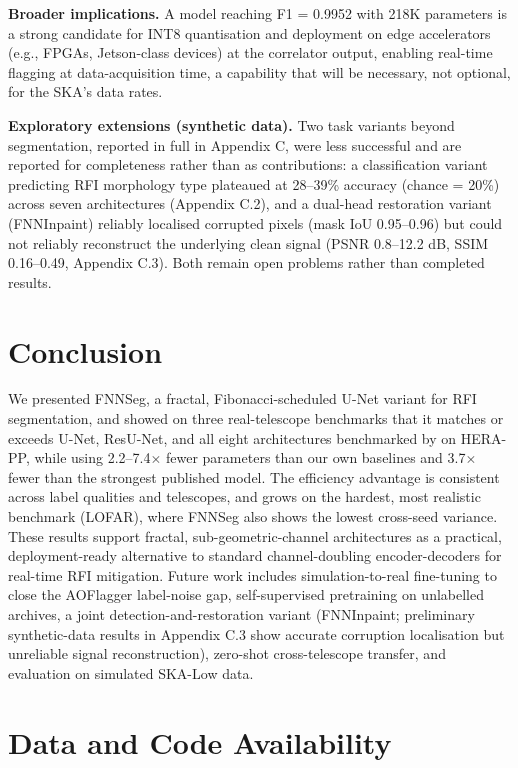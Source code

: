\documentclass[11pt]{article}
\begin{document}
\textbf{Broader implications.} A model reaching F1 = 0.9952 with 218K parameters is a strong candidate for INT8 quantisation and deployment on edge accelerators (e.g., FPGAs, Jetson-class devices) at the correlator output, enabling real-time flagging at data-acquisition time, a capability that will be necessary, not optional, for the SKA's data rates.

\textbf{Exploratory extensions (synthetic data).} Two task variants beyond segmentation, reported in full in Appendix C, were less successful and are reported for completeness rather than as contributions: a classification variant predicting RFI morphology type plateaued at 28--39\% accuracy (chance = 20\%) across seven architectures (Appendix C.2), and a dual-head restoration variant (FNNInpaint) reliably localised corrupted pixels (mask IoU 0.95--0.96) but could not reliably reconstruct the underlying clean signal (PSNR 0.8--12.2 dB, SSIM 0.16--0.49, Appendix C.3). Both remain open problems rather than completed results.

\section{Conclusion}

We presented FNNSeg, a fractal, Fibonacci-scheduled U-Net variant for RFI segmentation, and showed on three real-telescope benchmarks that it matches or exceeds U-Net, ResU-Net, and all eight architectures benchmarked by \citet{dutoit2023} on HERA-PP, while using 2.2--7.4$\times$ fewer parameters than our own baselines and 3.7$\times$ fewer than the strongest published model. The efficiency advantage is consistent across label qualities and telescopes, and grows on the hardest, most realistic benchmark (LOFAR), where FNNSeg also shows the lowest cross-seed variance. These results support fractal, sub-geometric-channel architectures as a practical, deployment-ready alternative to standard channel-doubling encoder-decoders for real-time RFI mitigation. Future work includes simulation-to-real fine-tuning to close the AOFlagger label-noise gap, self-supervised pretraining on unlabelled archives, a joint detection-and-restoration variant (FNNInpaint; preliminary synthetic-data results in Appendix C.3 show accurate corruption localisation but unreliable signal reconstruction), zero-shot cross-telescope transfer, and evaluation on simulated SKA-Low data.

\section*{Data and Code Availability}
\end{document}
